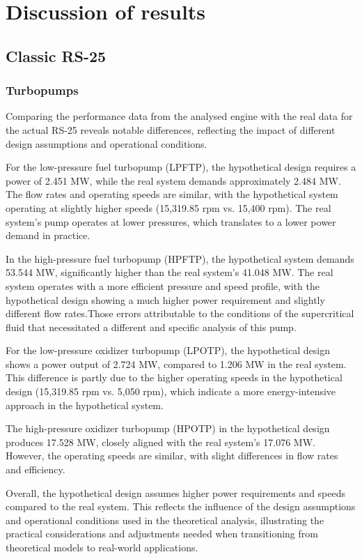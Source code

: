 \section{Discussion of results}
\subsection{Classic RS-25}
\subsubsection{Turbopumps}
Comparing the performance data from the analysed engine with the real data for the actual RS-25  reveals notable differences, reflecting the impact of different design assumptions and operational conditions.

For the low-pressure fuel turbopump (LPFTP), the hypothetical design requires a power of 2.451 MW, while the real system demands approximately 2.484 MW. The flow rates and operating speeds are similar, with the hypothetical system operating at slightly higher speeds (15,319.85 rpm vs. 15,400 rpm). The real system’s pump operates at lower pressures, which translates to a lower power demand in practice.

In the high-pressure fuel turbopump (HPFTP), the hypothetical system demands 53.544 MW, significantly higher than the real system’s 41.048 MW. The real system operates with a more efficient pressure and speed profile, with the hypothetical design showing a much higher power requirement and slightly different flow rates.Those errors attributable to the conditions of the supercritical fluid that necessitated a different and specific analysis of this pump.

For the low-pressure oxidizer turbopump (LPOTP), the hypothetical design shows a power output of 2.724 MW, compared to 1.206 MW in the real system. This difference is partly due to the higher operating speeds in the hypothetical design (15,319.85 rpm vs. 5,050 rpm), which indicate a more energy-intensive approach in the hypothetical system.

The high-pressure oxidizer turbopump (HPOTP) in the hypothetical design produces 17.528 MW, closely aligned with the real system’s 17.076 MW. However, the operating speeds are similar, with slight differences in flow rates and efficiency.

Overall, the hypothetical design assumes higher power requirements and speeds compared to the real system. This reflects the influence of the design assumptions and operational conditions used in the theoretical analysis, illustrating the practical considerations and adjustments needed when transitioning from theoretical models to real-world applications.

